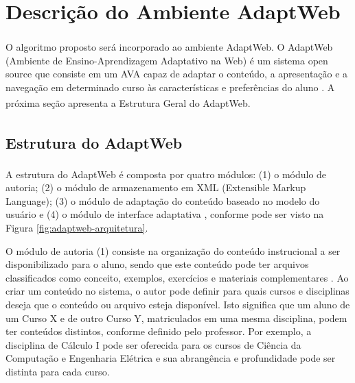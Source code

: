 \section{Descrição do Ambiente AdaptWeb\textsuperscript{\textregistered}}

O algoritmo proposto será incorporado ao ambiente AdaptWeb\textsuperscript{\textregistered}. O
AdaptWeb\textsuperscript{\textregistered} (Ambiente de Ensino-Aprendizagem Adaptativo na Web) é um sistema open source
que consiste em um AVA capaz de adaptar o conteúdo, a apresentação e a navegação em determinado curso às características
e preferências do aluno \cite{gasparini2009adaptweb}. A próxima seção apresenta a Estrutura Geral do
AdaptWeb\textsuperscript{\textregistered}.

\subsection{Estrutura do AdaptWeb\textsuperscript{\textregistered}}

A estrutura do AdaptWeb\textsuperscript{\textregistered} é composta por quatro módulos: (1) o módulo de autoria; (2) o
módulo de armazenamento em XML (Extensible Markup Language); (3) o módulo de adaptação do conteúdo baseado no modelo do
usuário e (4) o módulo de interface adaptativa \cite{gasparini2003interface}, conforme pode ser visto na Figura
\ref{fig:adaptweb-arquitetura}.

O módulo de autoria (1) consiste na organização do conteúdo instrucional a ser disponibilizado para o aluno, sendo que
este conteúdo pode ter arquivos classificados como conceito, exemplos, exercícios e materiais complementares
\cite{gasparini2003interface}. Ao criar um conteúdo no sistema, o autor pode definir para quais cursos e disciplinas
deseja que o conteúdo ou arquivo esteja disponível. Isto significa que um aluno de um Curso X e de outro Curso Y,
matriculados em uma mesma disciplina, podem ter conteúdos distintos, conforme definido pelo professor. Por exemplo, a
disciplina de Cálculo I pode ser oferecida para os cursos de Ciência da Computação e Engenharia Elétrica e sua
abrangência e profundidade pode ser distinta para cada curso.


